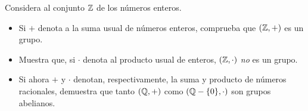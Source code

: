 \begin{ejem}
Considera al conjunto $\mathbb{Z}$ de los números enteros.
\begin{itemize}
	\item Si $+$ denota a la suma usual de números enteros,
	comprueba que $(\mathbb{Z}, +)$ es un grupo.
	\item Muestra que, si $\cdot$ denota al producto usual 
	de enteros, $(\mathbb{Z}, \cdot)$ \textit{no} es un grupo.
	\item Si ahora $+$ y $\cdot$ denotan, respectivamente, la
	suma y producto de números racionales, demuestra que
	tanto $(\mathbb{Q}, +)$ como $(\mathbb{Q} - \{ 0 \}, \cdot)$ son grupos abelianos.
\end{itemize}
\end{ejem}


